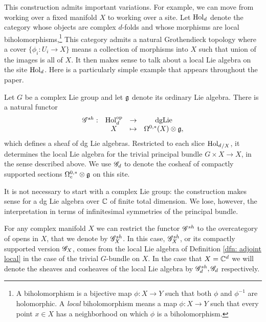 This construction admits important variations.
For example, we can move from working over a fixed manifold $X$ to working over a site.
Let ${\rm Hol}_d$ denote the category whose objects are complex $d$-folds and whose morphisms are local biholomorphisms,\footnote{A biholomorphism is a bijective map $\phi: X \to Y$ such that both $\phi$ and $\phi^{-1}$ are holomorphic. A {\em local} biholomorphism means a map $\phi: X \to Y$ such that every point $x \in X$ has a neighborhood on which $\phi$ is a biholomorphism.}
This category admits a natural Grothendieck topology where a cover $\{\phi_i: U_i \to X\}$ means a collection of morphisms into $X$ such that union of the images is all of $X$.
It then makes sense to talk about a local Lie algebra on the site ${\rm Hol}_d$.
Here is a particularly simple example that appears throughout the paper.

\begin{dfn}
Let $G$ be a complex Lie group and let $\mathfrak g$ denote its ordinary Lie algebra.
There is a natural functor 
\[
\begin{array}{cccc}
\mathscr G^{sh} :&  {\rm Hol}_d^{\rm op} & \to & {{\rm dgLie}}\\
& X & \mapsto &\Omega^{0,*}(X) \otimes \mathfrak g,
\end{array}
\]
which defines a sheaf of dg Lie algebras.
Restricted to each slice ${{\rm Hol}_d}_{/X}$, it determines the local Lie algebra for the trivial principal bundle $G \times X \to X$, in the sense described above.
We use $\mathscr G_d$ to denote the cosheaf of compactly supported sections $\Omega^{0,*}_c \otimes \mathfrak g$ on this site.
\end{dfn}

\begin{rmk}
It is not necessary to start with a complex Lie group: 
the construction makes sense for a dg Lie algebra over $\mathbb C$ of finite total dimension.
We lose, however, the interpretation in terms of infinitesimal symmetries of the principal bundle.
\end{rmk}

\begin{rmk}
For any complex manifold $X$ we can restrict the functor $\mathscr G^{sh}$ to the overcategory of opens in $X$, that we denote by $\mathscr G^{sh}_X$. 
In this case, $\mathscr G^{sh}_X$, or its compactly supported version $\mathscr G_X$, comes from the local Lie algebra of Definition \ref{dfn: adjoint local} in the case of the trivial $G$-bundle on $X$. 
In the case that $X = \mathbb C^d$ we will denote the sheaves and cosheaves of the local Lie algebra by $\mathscr G_d^{sh}, \mathscr G_d$ respectively.
\end{rmk}

